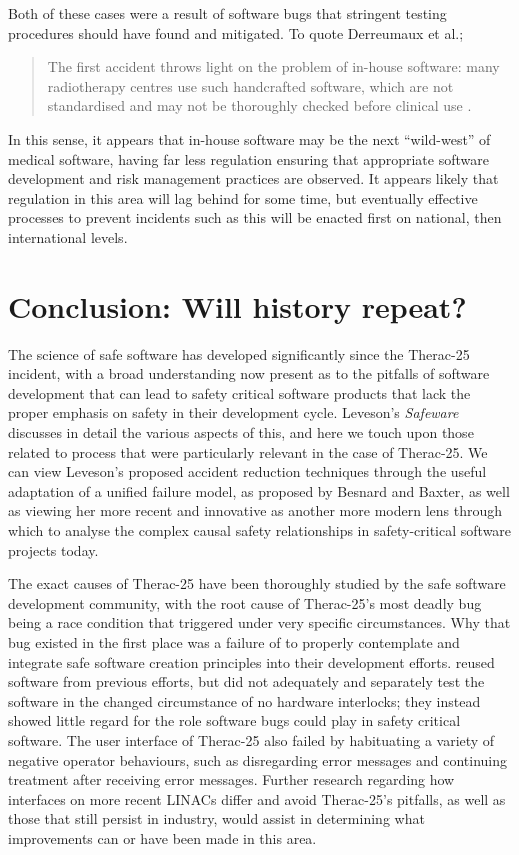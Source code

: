 \documentclass{cshonours}
\newcommand{\ther}{Therac-25\xspace}
\newcommand{\etal}{et al.\xspace}
\begin{document}
Both of these cases were a result of software bugs that stringent testing procedures should have found and mitigated. To quote Derreumaux \etal;
\begin{quote}
The first accident throws light on the problem of in-house software: many radiotherapy centres use such handcrafted software, which are not standardised and may not be thoroughly checked before clinical use \cite{derreumaux2008lessons}.
\end{quote}

In this sense, it appears that in-house software may be the next ``wild-west'' of medical software, having far less regulation ensuring that appropriate software development and risk management practices are observed. It appears likely that regulation in this area will lag behind for some time, but eventually effective processes to prevent incidents such as this will be enacted first on national, then international levels.



\chapter{Conclusion: Will history repeat?}
\label{chap:conclusion}
The science of safe software has developed significantly since the \ther incident, with a broad understanding now present as to the pitfalls of software development that can lead to safety critical software products that lack the proper emphasis on safety in their development cycle. Leveson's \textit{Safeware} discusses in detail the various aspects of this, and here we touch upon those related to process that were particularly relevant in the case of \ther. We can view Leveson's proposed accident reduction techniques through the useful adaptation of a unified failure model, as proposed by Besnard and Baxter, as well as viewing her more recent and innovative \stamp as another more modern lens through which to analyse the complex causal safety relationships in safety-critical software projects today.

The exact causes of \ther have been thoroughly studied by the safe software development community, with the root cause of \ther's most deadly bug being a race condition that triggered under very specific circumstances. Why that bug existed in the first place was a failure of \aecl to properly contemplate and integrate safe software creation principles into their development efforts. \aecl reused software from previous efforts, but did not adequately and separately test the software in the changed circumstance of no hardware interlocks; they instead showed little regard for the role software bugs could play in safety critical software. The user interface of \ther also failed by habituating a variety of negative operator behaviours, such as disregarding error messages and continuing treatment after receiving error messages. Further research regarding how interfaces on more recent LINACs differ and avoid \ther's \hci pitfalls, as well as those that still persist in industry, would assist in determining what improvements can or have been made in this area.
\end{document}
